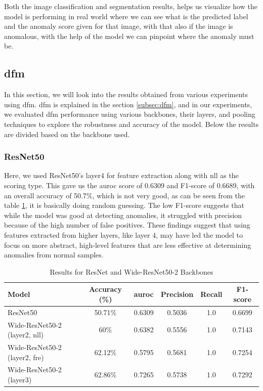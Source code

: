 Both the image classification and segmentation results, helps us visualize how the model is performing in real world where we can see what is the predicted label and the anomaly score given for that image, with that also if the image is anomalous, with the help of the model we can pinpoint where the anomaly must be.

\subsection*{\gls{dfm}}

In this section, we will look into the results obtained from various experiments using \gls{dfm}. \gls{dfm} is explained in the section \ref{subsec:dfm}, and in our experiments, we evaluated \gls{dfm} performance using various backbones, their layers, and pooling techniques to explore the robustness and accuracy of the model. Below the results are divided based on the backbone used. 

\subsubsection*{ResNet50}

Here, we used ResNet50's layer4 for feature extraction along with \gls{nll} as the scoring type. This gave us the \gls{auroc} score of 0.6309 and F1-score of 0.6689, with an overall accuracy of 50.7\%, which is not very good, as can be seen from the table \ref{tab:dfm resnet results}, it is basically doing random guessing. The low F1-score suggests that while the model was good at detecting anomalies, it struggled with precision because of the high number of false positives. These findings suggest that using features extracted from higher layers, like layer 4, may have led the model to focus on more abstract, high-level features that are less effective at determining anomalies from normal samples.

\begin{table}[ht!]
    \centering
    \begin{tabular}{|l|c|c|c|c|c|}
        \hline
        \textbf{Model} & \textbf{Accuracy (\%)} & \textbf{\gls{auroc}} &\textbf{Precision} & \textbf{Recall} & \textbf{F1-score} \\ \hline
        ResNet50 & 50.71\% & 0.6309 & 0.5036 & 1.0 & 0.6699 \\ \hline
        Wide-ResNet50-2 (layer2, nll) & 60\% & 0.6382 & 0.5556 & 1.0 & 0.7143 \\ \hline
        Wide-ResNet50-2 (layer2, fre) & 62.12\% & 0.5795 & 0.5681 & 1.0 & 0.7254 \\ \hline
        Wide-ResNet50-2 (layer3) & 62.86\% & 0.7265 & 0.5738 & 1.0 & 0.7292 \\ \hline
    \end{tabular}
    \caption{Results for ResNet and Wide-ResNet50-2 Backbones}
    \label{tab:dfm resnet results}
\end{table}

